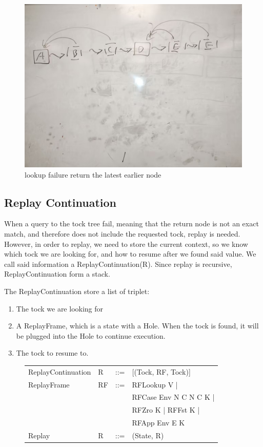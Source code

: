 \begin{figure}
    \includegraphics[width=0.5\columnwidth]{img4}
    \caption{lookup failure return the latest earlier node}
\end{figure}

\subsection{Replay Continuation}
When a query to the tock tree fail, meaning that the return node is not an exact match, and therefore does not include the requested tock, replay is needed. However, in order to replay, we need to store the current context, so we know which tock we are looking for, and how to resume after we found said value. We call said information a ReplayContinuation(R). Since replay is recursive, ReplayContinuation form a stack.

The ReplayContinuation store a list of triplet:
\begin{enumerate}
	\item The tock we are looking for
	\item A ReplayFrame, which is a state with a Hole. When the tock is found, it will be plugged into the Hole to continue execution.
	\item The tock to resume to.
\end{enumerate}

\begin{figure}
    \begin{tabular}{p{10em} p{2.6em} p{1em} p{}}
        ReplayContinuation & R & ::= & [(Tock, RF, Tock)] \\
        ReplayFrame & RF & ::= & RFLookup V | \\
        & & & RFCase Env N C N C K | \\
        & & & RFZro K | RFFst K | \\
        & & & RFApp Env E K \\
        Replay & R & ::= & (State, R) \\
    \end{tabular}
\end{figure}

